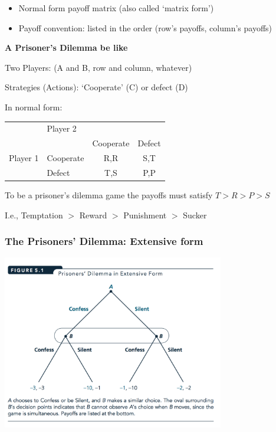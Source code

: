 \documentclass[]{article}
\begin{document}
\begin{itemize}
\item
  Normal form payoff matrix (also called `matrix form')
\item
  Payoff convention: listed in the order (row's payoffs, column's payoffs)
\end{itemize}

\bigskip

\textbf{A Prisoner's Dilemma be like}

Two Players: (A and B, row and column, whatever)

Strategies (Actions): `Cooperate' (C) or defect (D)

In normal form:

\begin{center}
\begin{tabular}{llcc}
                              & \multicolumn{3}{l}{Player 2}                                                                  \\ \cline{2-4}
\multicolumn{1}{l|}{}         & \multicolumn{1}{l|}{}          & \multicolumn{1}{l|}{Cooperate} & \multicolumn{1}{l|}{Defect} \\ \cline{2-4}
\multicolumn{1}{l|}{Player 1} & \multicolumn{1}{l|}{Cooperate} & \multicolumn{1}{c|}{R,R}       & \multicolumn{1}{c|}{S,T}    \\ \cline{2-4}
\multicolumn{1}{l|}{}         & \multicolumn{1}{l|}{Defect}    & \multicolumn{1}{c|}{T,S}       & \multicolumn{1}{c|}{P,P}    \\ \cline{2-4}
\end{tabular}
\end{center}

To be a prisoner's dilemma game the payoffs must satisfy \(T > R > P > S\)

I.e., Temptation \(>\) Reward \(>\) Punishment \(>\) Sucker

\hypertarget{the-prisoners-dilemma-extensive-form}{%
\subsubsection{The Prisoners' Dilemma: Extensive form}\label{the-prisoners-dilemma-extensive-form}}

\includegraphics[height=3in]{picsfigs/pd_extensive.png}
\end{document}
